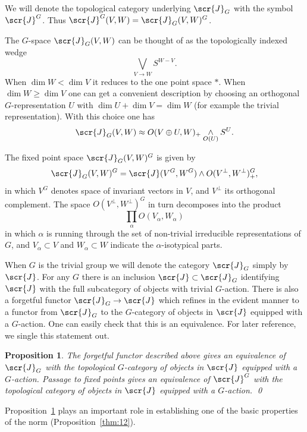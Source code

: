 \documentclass{amsart}
\newtheorem{prop}[equation]{Proposition}
\theoremstyle{definition}
\theoremstyle{remark}
\newcommand{\smashove}[1]{\underset{#1}{\wedge}}
\newcommand{\icat}{\scr{J}}
\newcommand{\igcat}[1]{\icat_{#1}}
\newcommand{\uigcat}[1]{\icat^{#1}}
\newcommand{\fixg}[1]{#1^{G}}
\begin{document}
We will denote the topological category underlying $\igcat{G}$ with
the symbol $\uigcat{G}$.  Thus $\uigcat{G}(V,W)=\igcat{G}(V,W)^{G}$.


The $G$-space $\igcat G(V,W)$ can be thought of as the topologically
indexed wedge
\[
\bigvee_{V\to W} S^{W-V}.
\]
When $\dim W<\dim V$ it reduces to the one point space $\ast$.  When
$\dim W\ge \dim V$ one can get a convenient description by choosing an
orthogonal $G$-representation $U$ with $\dim U+\dim V=\dim W$ (for
example the trivial representation).  With this choice one has
\[
\igcat G(V,W) \approx O(V\oplus U,W)_{+}\smashove{O(U)}S^{U}.
\]


The fixed point space $\igcat{G}(V,W)^{G}$ is given by 
\begin{equation}
\label{eq:139}
\igcat{G}(V,W)^{G} = 
\icat(\fixg{V},\fixg{W})\wedge O(V^{\perp},W^{\perp})^{G}_{+},
\end{equation}
in which $V^{G}$ denotes space of invariant vectors in $V$, 
and $V^{\perp}$ its orthogonal complement.   The space
$O(V^{\perp},W^{\perp})^{G}$ in turn decomposes into the product 
\[
\prod_{\alpha}O(V_{\alpha},W_{\alpha})
\]
in which $\alpha$ is running through the set of non-trivial
irreducible representations of $G$,  and $V_{\alpha}\subset V$ and
$W_{\alpha}\subset W$  indicate the $\alpha$-isotypical parts.
 
When $G$ is the trivial group we will denote the category $\igcat{G}$
simply by $\icat$.  For any $G$ there is an inclusion $\icat\subset
\igcat{G}$ identifying $\icat$ with the full subcategory of objects
with trivial $G$-action.  There is also a forgetful functor
$\igcat{G}\to \icat$ which refines in the evident manner to a functor
from $\igcat{G}$ to the $G$-category of objects in $\icat$ equipped
with a $G$-action.  One can easily check that this is an equivalence.
For later reference, we single this statement out.  

\begin{prop}
\label{thm:3} 
The forgetful functor described above gives an
equivalence of $\igcat{G}$ with the topological $G$-category of
objects in $\icat$ equipped with a $G$-action.  Passage to fixed
points gives an equivalence of $\uigcat{G}$ with the topological
category of objects in $\icat$ equipped with a $G$-action.  \qed
\end{prop}

Proposition~\ref{thm:3} plays an important role in establishing one of
the basic properties of the norm (Proposition~\ref{thm:12}).  
\end{document}
